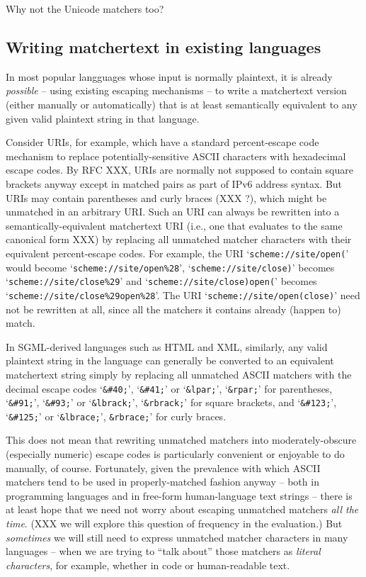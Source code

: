 Why not the Unicode matchers too?


\subsection{Writing matchertext in existing languages}

In most popular langguages whose input is normally plaintext,
it is already \emph{possible} -- using existing escaping mechanisms --
to write a matchertext version
(either manually or automatically)
that is at least semantically equivalent
to any given valid plaintext string in that language.

Consider URIs, for example,
which have a standard percent-escape code mechanism
to replace potentially-sensitive ASCII characters with hexadecimal escape codes.
By RFC XXX, URIs are normally not supposed to contain square brackets anyway
except in matched pairs as part of IPv6 address syntax.
But URIs may contain parentheses and curly braces (XXX ?),
which might be unmatched in an arbitrary URI.
Such an URI can always be rewritten
into a semantically-equivalent matchertext URI
(i.e., one that evaluates to the same canonical form XXX)
by replacing all unmatched matcher characters with their
equivalent percent-escape codes.
For example, the URI `\verb|scheme://site/open(|'
would become `\verb|scheme://site/open%28|',
`\verb|scheme://site/close)|'
becomes `\verb|scheme://site/close%29|'
and `\verb|scheme://site/close)open(|' becomes
`\verb|scheme://site/close%29open%28|'.
The URI `\verb|scheme://site/open(close)|'
need not be rewritten at all,
since all the matchers it contains already (happen to) match.

In SGML-derived languages such as HTML and XML, similarly,
any valid plaintext string in the language
can generally be converted to an equivalent matchertext string
simply by replacing all unmatched ASCII matchers
with the decimal escape codes
`\verb|&#40;|', `\verb|&#41;|' or
`\verb|&lpar;|', `\verb|&rpar;|' for parentheses,
`\verb|&#91;|', `\verb|&#93;|' or
`\verb|&lbrack;|', `\verb|&rbrack;|' for square brackets, and
`\verb|&#123;|', `\verb|&#125;|' or
`\verb|&lbrace;|', \verb|&rbrace;|' for curly braces.

This does not mean that rewriting unmatched matchers into moderately-obscure
(especially numeric) escape codes
is particularly convenient or enjoyable to do manually, of course.
Fortunately, given the prevalence with which ASCII matchers
tend to be used in properly-matched fashion anyway --
both in programming languages and in free-form human-language text strings --
there is at least hope that we need not worry about escaping unmatched matchers
\emph{all the time}.
(XXX we will explore this question of frequency in the evaluation.)
But \emph{sometimes} we will still need to express
unmatched matcher characters in many languages --
when we are trying to ``talk about'' those matchers
as \emph{literal characters}, for example,
whether in code or human-readable text.

